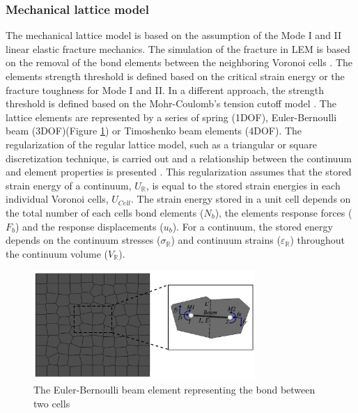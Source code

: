 \subsubsection*{Mechanical lattice model}
\label{Section:MechanicalLattice}

The mechanical lattice model is based on the assumption of the Mode I and II linear elastic fracture mechanics. The simulation of the fracture in LEM is based on the removal of the bond elements between the neighboring Voronoi cells \cite{Rizvietal2019a}. The elements strength threshold is defined based on the critical strain energy or the fracture toughness for Mode I and II. In a different approach, the strength threshold is defined based on the Mohr-Coulomb's tension cutoff model \cite{Bolanderetal1998}. The lattice elements are represented by a series of spring (1DOF),  Euler-Bernoulli beam (3DOF)(Figure \ref{fig:Amir_LEM_Beam}) or Timoshenko beam elements (4DOF). The regularization of the regular lattice model, such as a triangular or square discretization technique, is carried out and a relationship between the continuum and element properties is presented \cite{Ostojastarzewski2002, Karihalooetal2003}. This regularization assumes that the stored strain energy of a continuum, $U_{\mathbb{R}}$, is equal to the stored strain energies in each individual Voronoi cells, $U_{Cell}$. The strain energy stored in a unit cell depends on the total number of each cells bond elements ($N_b$), the elements response forces ($F_b$) and the response displacements ($u_b$). For a continuum, the stored energy depends on the continuum stresses ($\sigma_{\mathbb{R}}$) and continuum strains ($\varepsilon_{\mathbb{R}}$) throughout the continuum volume ($V_{\mathbb{R}}$).

\begin{figure}[!ht]
\centering
\includegraphics[width=0.75\textwidth]{figures/Amir_LEM_Beam.png}
\caption{The Euler-Bernoulli beam element representing the bond between two cells}
\label{fig:Amir_LEM_Beam}
\end{figure}

